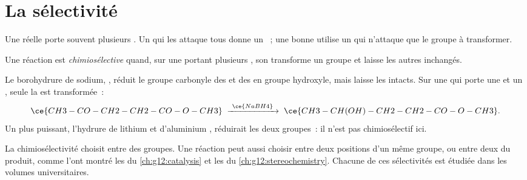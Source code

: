 \section{La sélectivité}

Une  réelle porte souvent plusieurs . Un
 qui les attaque tous donne un ~; une bonne 
utilise un  qui n'attaque que le groupe à transformer.

\begin{definition}\label{def:g12:synthesis-strategy:chemoselective}
Une réaction est \emph{chimiosélective}
quand, sur une  portant plusieurs , son
 transforme un groupe et laisse les autres inchangés.
\end{definition}

\begin{example}\label{ex:g12:synthesis-strategy:nabh4}
Le borohydrure de sodium, , réduit le groupe carbonyle des
 et des  en groupe hydroxyle, mais laisse les 
intacts. Sur une  qui porte une  et un , seule la
 est transformée~:
\[
  \ce{CH3-CO-CH2-CH2-CO-O-CH3}
  \;\xrightarrow{\ \ce{NaBH4}\ }\;
  \ce{CH3-CH(OH)-CH2-CH2-CO-O-CH3} .
\]
Un  plus puissant, l'hydrure de lithium et d'aluminium
, réduirait les deux groupes~: il n'est pas chimiosélectif
ici.
\end{example}

\begin{remark}\label{rem:g12:synthesis-strategy:kinds}
La chimiosélectivité choisit entre des groupes. Une réaction peut aussi
choisir entre deux positions d'un même groupe, ou entre deux
 du produit, comme l'ont montré les  du
\cref{ch:g12:catalysis} et les   du
\cref{ch:g12:stereochemistry}. Chacune de ces sélectivités est étudiée
dans les volumes universitaires.
\end{remark}

